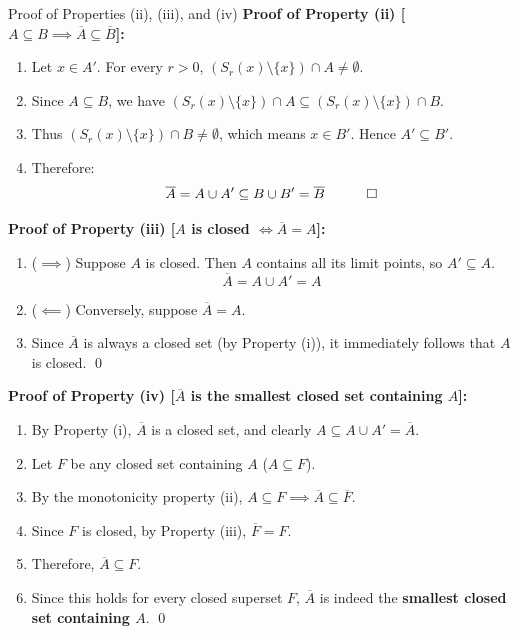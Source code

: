\documentclass[11pt,a4paper]{article}
\begin{document}
\begin{exbox}{Proof of Properties (ii), (iii), and (iv)}
\textbf{Proof of Property (ii) [$A \subseteq B \implies \overline{A} \subseteq \overline{B}$]:}
\begin{enumerate}
    \item Let $x \in A'$. For every $r > 0$, $(S_r(x) \setminus \{x\}) \cap A \neq \emptyset$.
    \item Since $A \subseteq B$, we have $(S_r(x) \setminus \{x\}) \cap A \subseteq (S_r(x) \setminus \{x\}) \cap B$.
    \item Thus $(S_r(x) \setminus \{x\}) \cap B \neq \emptyset$, which means $x \in B'$. Hence $A' \subseteq B'$.
    \item Therefore:
    \begin{equation}
        \overline{A} = A \cup A' \subseteq B \cup B' = \overline{B} \quad \qed
    \end{equation}
\end{enumerate}

\textbf{Proof of Property (iii) [$A$ is closed $\iff \overline{A} = A$]:}
\begin{enumerate}
    \item ($\implies$) Suppose $A$ is closed. Then $A$ contains all its limit points, so $A' \subseteq A$.
    \begin{equation}
        \overline{A} = A \cup A' = A
    \end{equation}
    \item ($\impliedby$) Conversely, suppose $\overline{A} = A$.
    \item Since $\overline{A}$ is always a closed set (by Property (i)), it immediately follows that $A$ is closed. \qed
\end{enumerate}

\textbf{Proof of Property (iv) [$\overline{A}$ is the smallest closed set containing $A$]:}
\begin{enumerate}
    \item By Property (i), $\overline{A}$ is a closed set, and clearly $A \subseteq A \cup A' = \overline{A}$.
    \item Let $F$ be any closed set containing $A$ ($A \subseteq F$).
    \item By the monotonicity property (ii), $A \subseteq F \implies \overline{A} \subseteq \overline{F}$.
    \item Since $F$ is closed, by Property (iii), $\overline{F} = F$.
    \item Therefore, $\overline{A} \subseteq F$.
    \item Since this holds for every closed superset $F$, $\overline{A}$ is indeed the \textbf{smallest closed set containing $A$}. \qed
\end{enumerate}
\end{exbox}
\end{document}
